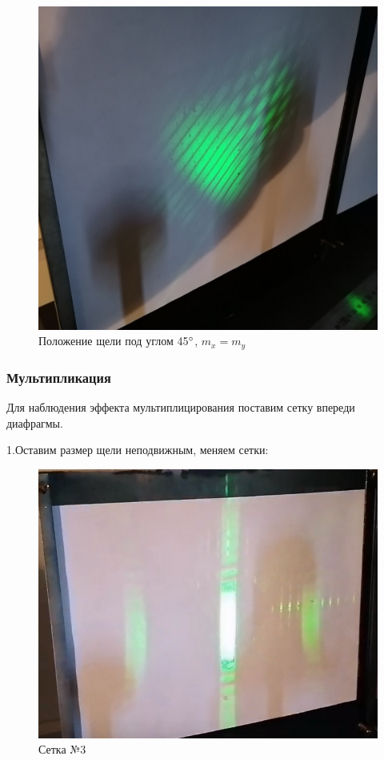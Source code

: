 \documentclass[a4paper, 12pt]{article}
\begin{document}
\begin{figure}[h!]
\begin{center}
\includegraphics[width=1\textwidth]{45_градусов.jpg}
\end{center}
\caption{Положение щели под углом 45$\degree$, $m_x=m_y$} \label{45}
\end{figure}

\clearpage
\subsubsection*{Мультипликация}

Для наблюдения эффекта мультиплицирования поставим сетку впереди диафрагмы.

1.Оставим размер щели неподвижным, меняем сетки:

\begin{figure}[h!]
\begin{center}
\includegraphics[width=1\textwidth]{Сетка3.png}
\end{center}
\caption{Сетка №3} \label{Сетка-3}
\end{figure}
\end{document}
